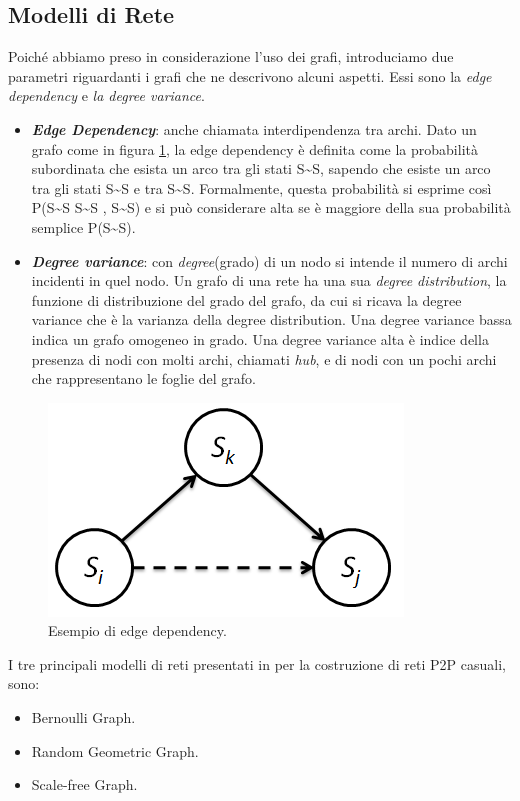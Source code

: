 \subsection{Modelli di Rete}
\label{subsec:modelli_rete}
Poiché abbiamo preso in considerazione l'uso dei grafi, introduciamo due parametri riguardanti i grafi che ne descrivono alcuni aspetti. Essi sono la \textit{edge dependency} e \textit{la degree variance}.
\begin{itemize}
	\item \textbf{\textit{Edge Dependency}}: anche chiamata interdipendenza tra archi. Dato un grafo come in figura \ref{fig:edge_dependency_02}, la edge dependency è definita come la probabilità subordinata che esista un arco tra gli stati S\textasciitilde S, sapendo che esiste un arco tra gli stati S\textasciitilde S e tra S\textasciitilde S. Formalmente, questa probabilità si esprime così P(S\textasciitilde S \textbar\: S\textasciitilde S , S\textasciitilde S) e si può considerare alta se è maggiore della sua probabilità semplice P(S\textasciitilde S).
	\item \textbf{\textit{Degree variance}}: con \textit{degree}(grado) di un nodo si intende il numero di archi incidenti in quel nodo. Un grafo di una rete ha una sua \textit{degree distribution}, la funzione di distribuzione del grado del grafo, da cui si ricava la degree variance che è la varianza della degree distribution. Una degree variance bassa indica un grafo omogeneo in grado. Una degree variance alta è indice della presenza di nodi con molti archi, chiamati \textit{hub}, e di nodi con un pochi archi che rappresentano le foglie del grafo.
\end{itemize}
\begin{figure}[h]
	\centering
	\includegraphics[width=0.5\linewidth,keepaspectratio]{Images/reti/edge_dependency_02}
	\caption[Edge dependency]{Esempio di edge dependency.}
	\label{fig:edge_dependency_02}
\end{figure}
I tre principali modelli di reti presentati in \cite{comparisonGAonRT2012} per la costruzione di reti \acs{P2P} casuali, sono:
\begin{itemize}
	\item Bernoulli Graph.
	\item Random Geometric Graph.
	\item Scale-free Graph.
\end{itemize}
\bigskip

